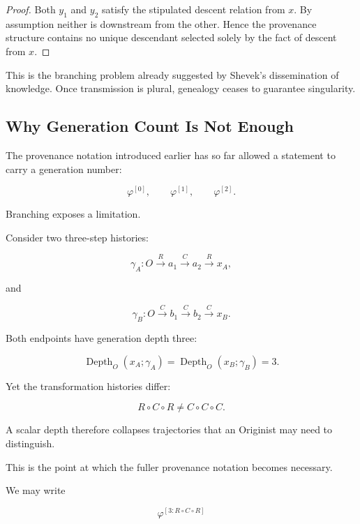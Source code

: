 \documentclass[
  11pt,
  a4paper,
  DIV=12,
  BCOR=0mm,
  parskip=half-
]{scrartcl}
\newcommand{\Depth}{\operatorname{Depth}}
\theoremstyle{definition}
\theoremstyle{plain}
\theoremstyle{remark}
\begin{document}
\begin{proof}
Both \(y_1\) and \(y_2\) satisfy the stipulated descent relation from \(x\).
By assumption neither is downstream from the other. Hence the provenance
structure contains no unique descendant selected solely by the fact of descent
from \(x\).
\end{proof}

This is the branching problem already suggested by Shevek's dissemination of
knowledge. Once transmission is plural, genealogy ceases to guarantee
singularity.


\subsection{Why Generation Count Is Not Enough}
\label{sec:generation-not-enough}

The provenance notation introduced earlier has so far allowed a statement to
carry a generation number:

\[
  \varphi^{[0]},
  \qquad
  \varphi^{[1]},
  \qquad
  \varphi^{[2]}.
\]

Branching exposes a limitation.

Consider two three-step histories:

\[
  \gamma_A:
  O
  \xrightarrow{R}
  a_1
  \xrightarrow{C}
  a_2
  \xrightarrow{R}
  x_A,
\]

and

\[
  \gamma_B:
  O
  \xrightarrow{C}
  b_1
  \xrightarrow{C}
  b_2
  \xrightarrow{C}
  x_B.
\]

Both endpoints have generation depth three:

\[
  \Depth_O(x_A;\gamma_A)
  =
  \Depth_O(x_B;\gamma_B)
  =
  3.
\]

Yet the transformation histories differ:

\[
  R\circ C\circ R
  \neq
  C\circ C\circ C.
\]

A scalar depth therefore collapses trajectories that an Originist may need to
distinguish.

This is the point at which the fuller provenance notation becomes necessary.

We may write

\[
  \varphi^{[3:R\circ C\circ R]}
\]
\end{document}
